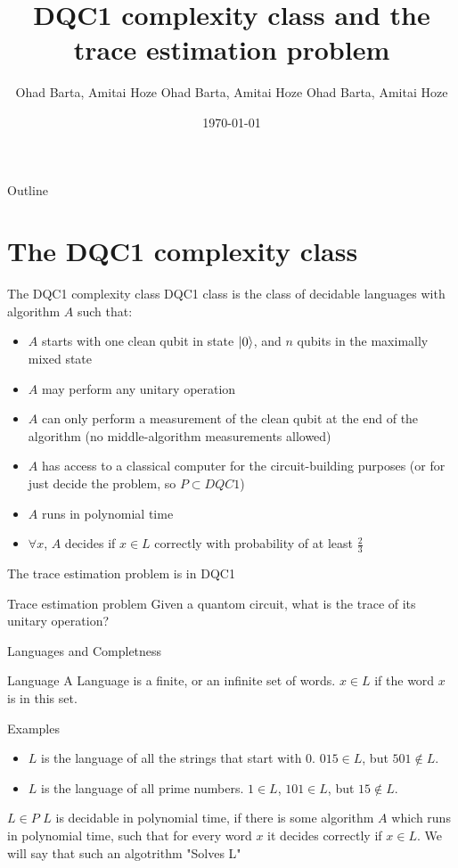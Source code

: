 \documentclass[leqno,fleqn]{beamer}
\author{Ohad Barta, Amitai Hoze Ohad Barta, Amitai Hoze Ohad Barta, Amitai Hoze}
\date{\today}
\title{DQC1 complexity class and the trace estimation problem}
\begin{document}
\maketitle
\begin{frame}{Outline}
\tableofcontents
\end{frame}


\section{The DQC1 complexity class}
\label{sec:orgheadline12}
\begin{frame}[label={sec:orgheadline1}]{The DQC1 complexity class}
DQC1 class is the class of decidable languages with algorithm \(A\) such that:

\begin{itemize}
\item \(A\) starts with one clean qubit in state \(\left\vert{0}\right\rangle\), and \(n\) qubits in
the maximally mixed state
\item \(A\) may perform any unitary operation
\item \(A\) can only perform a measurement of the clean qubit at the end of
the algorithm (no middle-algorithm measurements allowed)
\item \(A\) has access to a classical computer for the circuit-building purposes (or for just decide the problem, so \(P \subset DQC1\))
\item \(A\) runs in polynomial time
\item \(\forall x\), \(A\) decides if \(x \in L\) correctly with probability of
at least \(\frac{2}{3}\)
\end{itemize}
\end{frame}
\begin{frame}[label={sec:orgheadline2}]{The trace estimation problem is in DQC1}
\begin{block}{Trace estimation problem}
Given a quantom circuit, what is the trace of its unitary operation?
\end{block}
\end{frame}
\begin{frame}[label={sec:orgheadline3}]{Languages and Completness}
\begin{block}{Language}
A Language is a finite, or an infinite set of words. \(x \in L\) if the word \(x\) is in this set.
\end{block}
\begin{block}{Examples}
\begin{itemize}
\item \(L\) is the language of all the strings that start with 0. \(015 \in L\),
but \(501 \notin L\).
\item \(L\) is the language of all prime numbers. \(1 \in L\), \(101 \in L\),
but \(15 \notin L\).
\end{itemize}
\end{block}
\begin{block}{\(L \in P\)}
\(L\) is decidable in polynomial time, if there is some algorithm \(A\) which runs in polynomial time, such that for every word \(x\)
it decides correctly if \(x \in L\). We will say that such an algotrithm "Solves L"
\end{block}
\end{frame}
\end{document}

